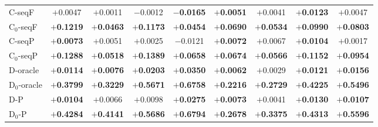 \begin{table}[htbp]
\begin{tabular}{lcccc|cccc}
C-seqF & $+$0.0047 & $+$0.0011 & $-$0.0012 & \textbf{$-$0.0165} & \textbf{$+$0.0051} & $+$0.0041 & \textbf{$+$0.0123} & $+$0.0047 \\
C$_0$-seqF & \textbf{$+$0.1219} & \textbf{$+$0.0463} & \textbf{$+$0.1173} & \textbf{$+$0.0454} & \textbf{$+$0.0690} & \textbf{$+$0.0534} & \textbf{$+$0.0990} & \textbf{$+$0.0803} \\
C-seqP & \textbf{$+$0.0073} & $+$0.0051 & $+$0.0025 & $-$0.0121 & \textbf{$+$0.0072} & $+$0.0067 & \textbf{$+$0.0104} & $+$0.0017 \\
C$_0$-seqP & \textbf{$+$0.1288} & \textbf{$+$0.0518} & \textbf{$+$0.1389} & \textbf{$+$0.0658} & \textbf{$+$0.0674} & \textbf{$+$0.0566} & \textbf{$+$0.1152} & \textbf{$+$0.0954} \\
D-oracle & \textbf{$+$0.0114} & \textbf{$+$0.0076} & \textbf{$+$0.0203} & \textbf{$+$0.0350} & \textbf{$+$0.0062} & $+$0.0029 & \textbf{$+$0.0121} & \textbf{$+$0.0156} \\
D$_0$-oracle & \textbf{$+$0.3799} & \textbf{$+$0.3229} & \textbf{$+$0.5671} & \textbf{$+$0.6758} & \textbf{$+$0.2216} & \textbf{$+$0.2729} & \textbf{$+$0.4225} & \textbf{$+$0.5496} \\
D-P & \textbf{$+$0.0104} & $+$0.0066 & $+$0.0098 & \textbf{$+$0.0275} & \textbf{$+$0.0073} & $+$0.0041 & \textbf{$+$0.0130} & \textbf{$+$0.0107} \\
D$_0$-P & \textbf{$+$0.4284} & \textbf{$+$0.4141} & \textbf{$+$0.5686} & \textbf{$+$0.6794} & \textbf{$+$0.2678} & \textbf{$+$0.3375} & \textbf{$+$0.4313} & \textbf{$+$0.5596} \\
\bottomrule
\end{tabular}
\end{table}
